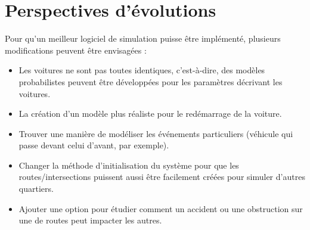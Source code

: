 \documentclass[12pt]{article} %
\begin{document}
\newpage
\section{Perspectives d'évolutions}\label{evolution}
Pour qu’un meilleur logiciel de simulation puisse être implémenté, plusieurs modifications peuvent être envisagées : 

\begin{itemize}
\item Les voitures ne sont pas toutes identiques, c’est-à-dire, des modèles probabilistes peuvent être développées pour les paramètres décrivant les voitures. 

\item La création d’un modèle plus réaliste pour le redémarrage de la voiture. 

\item Trouver une manière de modéliser les événements particuliers (véhicule qui passe devant celui d’avant, par exemple). 

\item Changer la méthode d'initialisation du système pour que les routes/intersections puissent aussi être facilement créées pour simuler d'autres quartiers.

\item Ajouter une option pour étudier comment un accident ou une obstruction sur une de routes peut impacter les autres.
\end{itemize}
\end{document}
